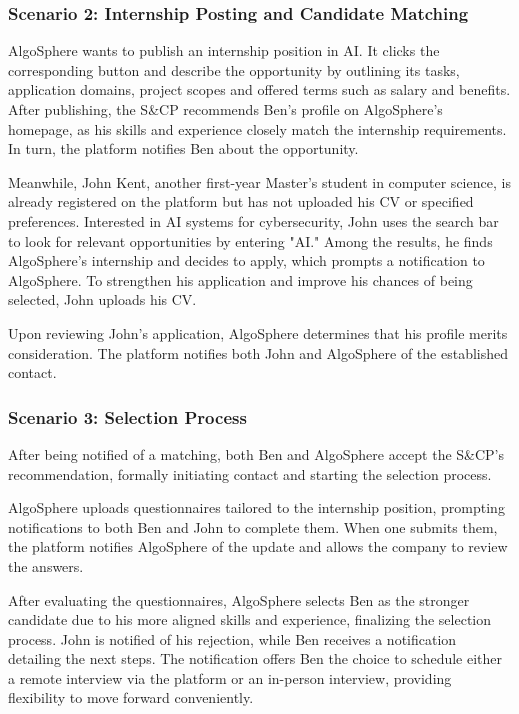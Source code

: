 \subsubsection{Scenario 2: Internship Posting and Candidate Matching}
AlgoSphere wants to publish an internship position in AI. It clicks the corresponding button and describe the opportunity by outlining its tasks, application domains, project scopes and offered terms such as salary and benefits.
After publishing, the S\&CP recommends Ben’s profile on AlgoSphere’s homepage, as his skills and experience closely match the internship requirements.
In turn, the platform notifies Ben about the opportunity.

Meanwhile, John Kent, another first-year Master's student in computer science, is already registered on the platform but has not uploaded his CV or specified preferences.
Interested in AI systems for cybersecurity, John uses the search bar to look for relevant opportunities by entering "AI."
Among the results, he finds AlgoSphere’s internship and decides to apply, which prompts a notification to AlgoSphere.
To strengthen his application and improve his chances of being selected, John uploads his CV.

Upon reviewing John’s application, AlgoSphere determines that his profile merits consideration. The platform notifies both John and AlgoSphere of the established contact.

\subsubsection{Scenario 3: Selection Process}
After being notified of a matching, both Ben and AlgoSphere accept the S\&CP's recommendation, formally initiating contact and starting the selection process.

AlgoSphere uploads questionnaires tailored to the internship position, prompting notifications to both Ben and John to complete them. When one submits them, the platform notifies AlgoSphere of the update and allows the company to review the answers.

After evaluating the questionnaires, AlgoSphere selects Ben as the stronger candidate due to his more aligned skills and experience, finalizing the selection process. John is notified of his rejection, while Ben receives a notification detailing the next steps. The notification offers Ben the choice to schedule either a remote interview via the platform or an in-person interview, providing flexibility to move forward conveniently.

